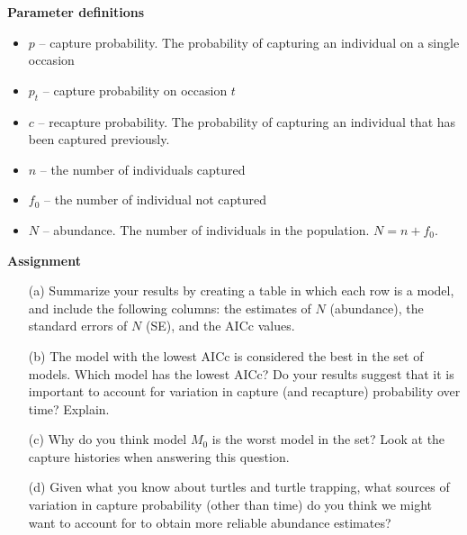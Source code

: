\documentclass[12pt]{article}
\begin{document}
\clearpage



{\bf Parameter definitions}
\begin{itemize}
  \item $p$ -- capture probability. The probability of capturing an
    individual on a single occasion
  \item $p_t$ -- capture probability on occasion $t$
  \item $c$ -- recapture probability. The probability of capturing an
    individual that has been captured previously.
  \item $n$ -- the number of individuals captured
  \item $f_0$ -- the number of individual not captured
  \item $N$ -- abundance. The number of individuals in the
    population. $N=n+f_0$. 
\end{itemize}

\vspace{1cm}

{\bf Assignment}

\begin{enumerate}
  \item[(a)] Summarize your results by creating a table in which each row
    is a model, and include the following columns: the estimates of $N$
    (abundance), the standard errors of $N$ (SE), and the AICc
    values. 
  \item[(b)] The model with the lowest AICc is considered the best in
    the set of models. Which model has the lowest AICc? Do your
    results suggest that it is important to account for variation in
    capture (and recapture) probability over time? Explain.
  \item[(c)] Why do you think model $M_0$ is the worst model
    in the set? Look at the capture histories when answering this
    question. 
  \item[(d)] Given what you know about turtles and turtle trapping,
    what sources of variation in capture probability (other than time)
    do you think we might want to account for to obtain more reliable
    abundance estimates?
\end{enumerate}
\end{document}
